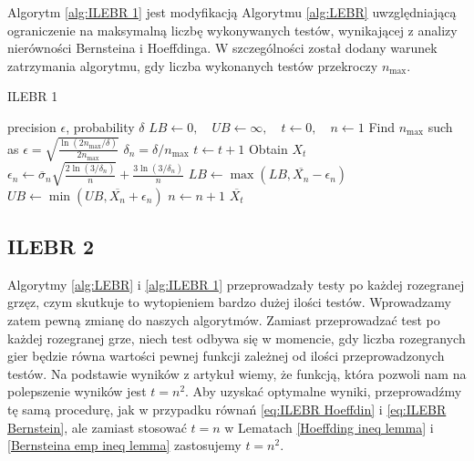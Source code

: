 \documentclass[inzynierska]{pwr_wmat_praca_dyplomowa}
\theoremstyle{plain}
\numberwithin{theorem}{chapter}
\theoremstyle{definition}
\numberwithin{theorem}{chapter}
\newcommand{\nmax}{n_{\text{max}}}
\begin{document}
	Algorytm \ref{alg:ILEBR 1} jest modyfikacją Algorytmu \ref{alg:LEBR} uwzględniającą ograniczenie na maksymalną liczbę wykonywanych testów, wynikającej z analizy nierówności Bernsteina i Hoeffdinga. W szczególności został dodany warunek zatrzymania algorytmu, gdy liczba wykonanych testów przekroczy $\nmax$. 
	\begin{algorithm}[H]
		\caption{ILEBR 1}\label{alg:ILEBR 1}
		\begin{algorithmic}
			\Ensure precision $\epsilon$, probability $\delta$
			\State $LB \gets 0, \quad UB \gets \infty, \quad t \gets 0, \quad n \gets 1$
			\State Find $\nmax$ such as $		\epsilon =  \sqrt{\frac{\ln(2\nmax/\delta)}{2\nmax}} $
			\Statex $\delta_n = \delta/\nmax$
			\While{$ UB - LB > 2\epsilon $ or $n\le \nmax$}  
			\State $t \gets t + 1$
			\State Obtain $X_t$
			\State $\epsilon_n \gets \overline{\sigma}_n \sqrt{\frac{2\ln(3/\delta_n)}{n}} + \frac{3  \ln{(3 / \delta_n)}}{n}$ 
			\State $LB \gets \max(LB, \overline{X_n} - \epsilon_n)$
			\State $UB \gets \min(UB, \overline{X_n} + \epsilon_n)$
			\State $n \gets n + 1$
			\EndWhile
			\State \Return $ \overline{X_t}$		
		\end{algorithmic}
	\end{algorithm}
	\subsection{ILEBR 2}
	Algorytmy \ref{alg:LEBR} i \ref{alg:ILEBR 1} przeprowadzały testy po każdej rozegranej grzęz, czym skutkuje to wytopieniem bardzo dużej ilości testów. Wprowadzamy zatem pewną zmianę do naszych algorytmów. Zamiast przeprowadzać test po każdej rozegranej grze, niech test odbywa się w momencie, gdy liczba rozegranych gier będzie równa wartości pewnej funkcji zależnej od ilości przeprowadzonych testów. Na podstawie wyników z artykuł \cite{heidrich2011non} wiemy, że funkcją, która pozwoli nam na polepszenie wyników jest $t = n^2$. Aby uzyskać optymalne wyniki, przeprowadźmy tę samą procedurę, jak w przypadku równań \eqref{eq:ILEBR Hoeffdin} i \eqref{eq:ILEBR Bernstein}, ale zamiast stosować $t = n$ w Lematach \ref{Hoeffding ineq lemma} i \ref{Bernsteina emp ineq lemma} zastosujemy $t = n^2$.
	
\end{document}
